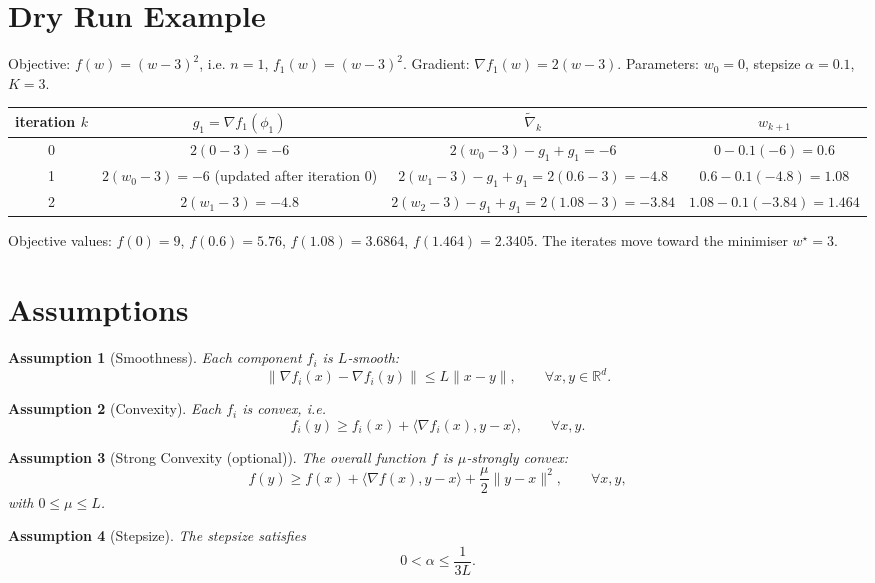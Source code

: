 \documentclass{article}
\newtheorem{assumption}{Assumption}
\newcommand{\R}{\mathbb{R}}
\begin{document}
\section*{Dry Run Example}
Objective: $f(w)=(w-3)^2$, i.e. $n=1$, $f_1(w)= (w-3)^2$.  
Gradient: $\nabla f_1(w)=2(w-3)$.  
Parameters: $w_0=0$, stepsize $\alpha=0.1$, $K=3$.

\begin{center}
\begin{tabular}{c|c|c|c}
iteration $k$ & $g_1=\nabla f_1(\phi_1)$ & $\widetilde{\nabla}_k$ & $w_{k+1}$ \\ \hline
0 & $2(0-3)=-6$ & $2(w_0-3)-g_1+g_1 = -6$ & $0-0.1(-6)=0.6$ \\ \hline
1 & $2(w_0-3)=-6$ (updated after iteration 0) & $2(w_1-3)-g_1+g_1 =2(0.6-3)=-4.8$ & $0.6-0.1(-4.8)=1.08$ \\ \hline
2 & $2(w_1-3)=-4.8$ & $2(w_2-3)-g_1+g_1 =2(1.08-3)=-3.84$ & $1.08-0.1(-3.84)=1.464$ \\ \hline
\end{tabular}
\end{center}

Objective values: $f(0)=9$, $f(0.6)=5.76$, $f(1.08)=3.6864$, $f(1.464)=2.3405$.  The iterates move toward the minimiser $w^\star=3$.

\section*{Assumptions}
\begin{assumption}[Smoothness]\label{ass:smooth}
Each component $f_i$ is $L$‑smooth:
\[
\|\nabla f_i(x)-\nabla f_i(y)\|\le L\|x-y\|,\qquad\forall x,y\in\R^{d}.
\]
\end{assumption}
\begin{assumption}[Convexity]\label{ass:convex}
Each $f_i$ is convex, i.e.
\[
f_i(y)\ge f_i(x)+\langle\nabla f_i(x),y-x\rangle,\qquad\forall x,y.
\]
\end{assumption}
\begin{assumption}[Strong Convexity (optional)]\label{ass:strong}
The overall function $f$ is $\mu$‑strongly convex:
\[
f(y)\ge f(x)+\langle\nabla f(x),y-x\rangle+\frac{\mu}{2}\|y-x\|^{2},\qquad\forall x,y,
\]
with $0\le\mu\le L$.
\end{assumption}
\begin{assumption}[Stepsize]\label{ass:stepsize}
The stepsize satisfies
\[
0<\alpha\le\frac{1}{3L}.
\]
\end{assumption}
\end{document}
